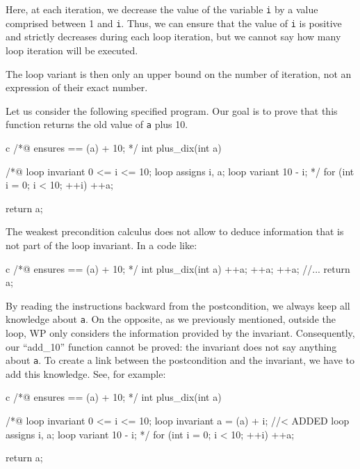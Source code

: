 Here, at each iteration, we decrease the value of the variable
\texttt{i} by a value comprised between 1 and \texttt{i}. Thus, we can
ensure that the value of \texttt{i} is positive and strictly decreases
during each loop iteration, but we cannot say how many loop iteration
will be executed.



The loop variant is then only an upper bound on the number of iteration,
not an expression of their exact number.





Let us consider the following specified program. Our goal is to prove
that this function returns the old value of \texttt{a} plus 10.



\begin{CodeBlock}{c}
/*@
    ensures \result == \old(a) + 10;
*/
int plus_dix(int a){
    /*@
        loop invariant 0 <= i <= 10;
        loop assigns i, a;
        loop variant 10 - i;
    */
    for (int i = 0; i < 10; ++i)
        ++a;

    return a;
}
\end{CodeBlock}



The weakest precondition calculus does not allow to deduce information
that is not part of the loop invariant. In a code like:



\begin{CodeBlock}{c}
/*@
    ensures \result == \old(a) + 10;
*/
int plus_dix(int a){
    ++a;
    ++a;
    ++a;
    //...
    return a;
}
\end{CodeBlock}


By reading the instructions backward
from the postcondition, we always keep all knowledge about \texttt{a}. On
the opposite, as we previously mentioned, outside the loop, WP only
considers the information provided by the invariant. Consequently, our
``add\_10'' function cannot be proved: the invariant does not say anything
about \texttt{a}. To create a link between the postcondition and the
invariant, we have to add this knowledge. See, for example:



\begin{CodeBlock}{c}
/*@
    ensures \result == \old(a) + 10;
*/
int plus_dix(int a){
    /*@
        loop invariant 0 <= i <= 10;
        loop invariant a = \old(a) + i; //< ADDED
        loop assigns i, a;
        loop variant 10 - i;
    */
    for (int i = 0; i < 10; ++i)
        ++a;

    return a;
}
\end{CodeBlock}



